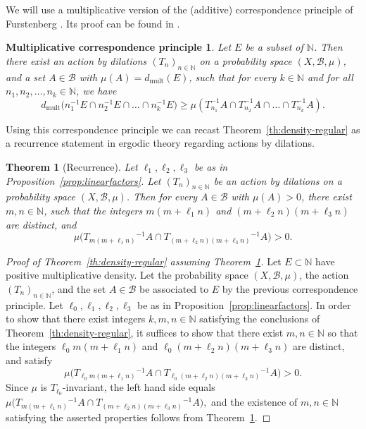 \documentclass[11pt]{amsart}
\newtheorem{theorem}[lemma]{Theorem}
\newtheorem*{MCP}{Multiplicative correspondence principle}
\theoremstyle{definition}
\begin{document}
We will use a multiplicative version of the (additive)
correspondence principle of Furstenberg \cite{Fu81}.
Its proof
can be found in
\cite{Be05}.
\begin{MCP}
Let $E$ be a subset of ${{\mathbb N}}$.
Then there exist an action by dilations  $(T_n)_{n\in{{\mathbb N}}}$ on a
probability space $(X,{{\mathcal B}}, \mu)$, and a set $A\in {{\mathcal B}}$ with
$\mu(A)={d_\textrm{mult}}(E)$, such that  for every $k\in{{\mathbb N}}$ and for all
$n_1,n_2,\dots , n_k\in{{\mathbb N}}$, we have
$$
{d_\textrm{mult}}\bigl( n_1^{-1}E\cap  n_2^{-1}E\cap \dots\cap
n_k^{-1}E\bigr)\geq \mu(T_{n_1}^{-1}A\cap T_{n_2}^{-1}A\cap\dots\cap
T_{n_k}^{-1}A).
$$
\end{MCP}
Using this correspondence principle we can recast Theorem~\ref{th:density-regular}  as a recurrence statement in ergodic theory regarding actions by dilations.
\begin{theorem}[Recurrence]
\label{th:recurecen1}
 Let $
\ell_1,\ell_2,\ell_3$ be   as in Proposition~\ref{prop:linearfactors}.
  Let $(T_n)_{n\in{{\mathbb N}}}$ be an action by dilations on a probability
space $(X,{{\mathcal B}},\mu)$. Then for every $A\in {{\mathcal B}}$ with $\mu(A)>0$,
there exist $m,n\in{{\mathbb N}}$, such that the integers $m(m+\ell_1n)$ and
$(m+\ell_2n)(m+\ell_3n)$  are distinct,  and
$$
\mu\bigl(T_{m(m+\ell_1n)}{^{-1}} A\cap
T_{(m+\ell_2n)(m+\ell_3n)}{^{-1}} A\bigr)>0.
$$
\end{theorem}
\begin{proof}[Proof of Theorem~\ref{th:density-regular} assuming Theorem~\ref{th:recurecen1}]
Let  $E\subset  {{\mathbb N}}$  have positive multiplicative density.
Let the probability space $(X,{{\mathcal B}}, \mu)$, the action
$(T_n)_{n\in{{\mathbb N}}}$, and the set $A\in {{\mathcal B}}$ be associated to $E$ by the previous correspondence
principle. Let $\ell_0,\ell_1,\ell_2,\ell_3$ be as in  Proposition~\ref{prop:linearfactors}. In order to show  that there exist  integers $k,m, n\in{{\mathbb N}}$
satisfying the conclusions of Theorem~\ref{th:density-regular}, it
suffices to show that there exist   $m, n\in{{\mathbb N}}$ so that
 the integers $\ell_0m(m+\ell_1n)$ and
$\ell_0(m+\ell_2n)(m+\ell_3n)$ are distinct, and satisfy
$$
\mu\bigl(T_{\ell_0 m(m+\ell_1n)}{^{-1}} A\cap T_{\ell_0 (m+\ell_2n)(m+\ell_3n)}{^{-1}}
A\bigr)>0.
$$
Since $\mu$ is $T_{\ell_0}$-invariant, the left hand side equals
$
\mu\bigl(T_{m(m+\ell_1n)}{^{-1}} A\cap T_{(m+\ell_2n)(m+\ell_3n)}{^{-1}} A\bigr),
$
and the existence of $m,n\in {{\mathbb N}}$ satisfying the asserted properties
follows from Theorem~\ref{th:recurecen1}.
\end{proof}
\end{document}
